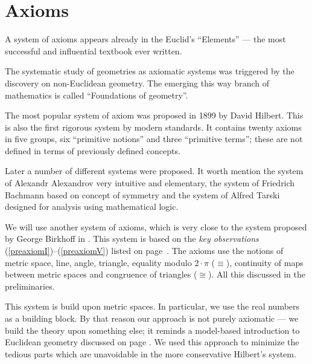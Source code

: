 \chapter{Axioms}
\label{chap:axioms}


\vfill

A system of axioms appears already in the Euclid's ``Elements'' --- the most successful and influential textbook ever written.

The systematic study of geometries as axiomatic systems
 was
triggered by the discovery on non-Euclidean geometry.
The emerging this way branch of mathematics is called ``Foundations of geometry''.

The most popular system of axiom
was proposed in 1899 by David Hilbert.
This is also the first rigorous system by modern standards.
It contains twenty axioms in five groups, six ``primitive notions'' and three ``primitive terms'';
these are not defined in terms of previously defined concepts.

Later a number of different systems were proposed.
It worth mention
the system of Alexandr Alexandrov \cite{alexandrov} very intuitive and elementary, 
the system of Friedrich Bachmann \cite{bachmann} based on concept of symmetry
and the system of Alfred Tarski \cite{tarski} designed for analysis using mathematical logic.

We will use another system of axioms,
which is very close to the system proposed by George Birkhoff in \cite{birkhoff}.
This system is based on the \emph{key observations}  (\ref{preaxiomI})--(\ref{preaxiomV}) listed on page~\pageref{preaxiomI}.
The axioms use the notions of 
metric space, 
line, 
angle,
triangle,
equality modulo $2\cdot\pi$ ($\equiv$), 
continuity of maps between metric spaces
and congruence of triangles ($\cong$).
All this discussed in the preliminaries.

This system is build upon metric spaces.
In particular, we use the real numbers as a building block. 
By that reason our approach is not purely axiomatic --- we build the theory upon something else;
it reminds a model-based introduction to Euclidean geometry discussed on page \pageref{page:model}.
We used this approach to minimize the tedious parts which are unavoidable in the more conservative Hilbert's system.




